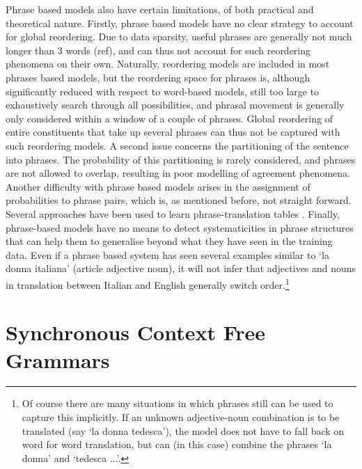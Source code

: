 \documentclass{report}
\theoremstyle{break}
\begin{document}
Phrase based models also have certain limitations, of both practical and theoretical nature. Firstly, phrase based models have no clear strategy to account for global reordering. Due to data sparsity, useful phrases are generally not much longer than 3 words (ref), and can thus not account for such reordering phenomena on their own. Naturally, reordering models are included in most phrases based models, but the reordering space for phrases is, although significantly reduced with respect to word-based models, still too large to exhaustively search through all possibilities, and phrasal movement is generally only considered within a window of a couple of phrases. Global reordering of entire constituents that take up several phrases can thus not be captured with such reordering models. A second issue concerns the partitioning of the sentence into phrases. The probability of this partitioning is rarely considered, and phrases are not allowed to overlap, resulting in poor modelling of agreement phenomena. Another difficulty with phrase based models arises in the assignment of probabilities to phrase pairs, which is, as mentioned before, not straight forward. Several approaches have been used to learn phrase-translation tables \citep[see][p.130]{koehn2008statistical}. Finally, phrase-based models have no means to detect systematicities in phrase structures that can help them to generalise beyond what they have seen in the training data. Even if a phrase based system has seen several examples similar to `la donna italiana' (article adjective noun), it will not infer that adjectives and nouns in translation between Italian and English generally switch order.\footnote{Of course there are many situations in which phrases still can be used to capture this implicitly. If an unknown adjective-noun combination is to be translated (say `la donna tedesca'), the model does not have to fall back on word for word translation, but can (in this case) combine the phrases `la donna' and `tedesca ...'.}

\section{Synchronous Context Free Grammars}
\label{sec:SCFGs}
\end{document}
